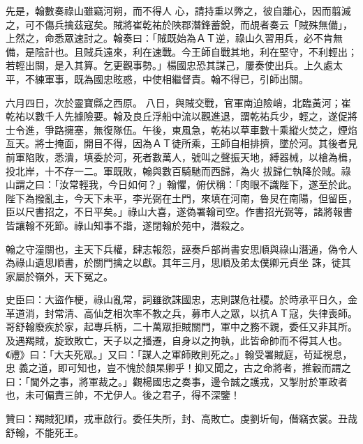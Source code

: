 \begin{pinyinscope}
 先是，翰數奏祿山雖竊河朔，而不得人
 心，請持重以弊之，彼自離心，因而翦滅之，可不傷兵擒茲寇矣。賊將崔乾祐於陜郡潛鋒蓄銳，而覘者奏云「賊殊無備」，上然之，命悉眾速討之。翰奏曰：「賊既始為ＡＴ逆，祿山久習用兵，必不肯無備，是陰計也。且賊兵遠來，利在速戰。今王師自戰其地，利在堅守，不利輕出；若輕出關，是入其算。乞更觀事勢。」楊國忠恐其謀己，屢奏使出兵。上久處太平，不練軍事，既為國忠眩惑，中使相繼督責。翰不得已，引師出關。



 六月四日，次於靈寶縣之西原。
 八日，與賊交戰，官軍南迫險峭，北臨黃河；崔乾祐以數千人先據險要。翰及良丘浮船中流以觀進退，謂乾祐兵少，輕之，遂促將士令進，爭路擁塞，無復隊伍。午後，東風急，乾祐以草車數十乘縱火焚之，煙焰亙天。將士掩面，開目不得，因為ＡＴ徒所乘，王師自相排擠，墜於河。其後者見前軍陷敗，悉潰，填委於河，死者數萬人，號叫之聲振天地，縛器械，以槍為楫，投北岸，十不存一二。軍既敗，翰與數百騎馳而西歸，為火
 拔歸仁執降於賊。祿山謂之曰：「汝常輕我，今日如何？」翰懼，俯伏稱：「肉眼不識陛下，遂至於此。陛下為撥亂主，今天下未平，李光弼在土門，來填在河南，魯炅在南陽，但留臣，臣以尺書招之，不日平矣。」祿山大喜，遂偽署翰司空。作書招光弼等，諸將報書皆讓翰不死節。祿山知事不諧，遂閉翰於苑中，潛殺之。



 翰之守潼關也，主天下兵權，肆志報怨，誣奏戶部尚書安思順與祿山潛通，偽令人為祿山遺思順書，於關門擒之以獻。其年三月，思順及弟太僕卿元貞坐
 誅，徙其家屬於嶺外，天下冤之。



 史臣曰：大盜作梗，祿山亂常，詞雖欲誅國忠，志則謀危社稷。於時承平日久，金革道消，封常清、高仙芝相次率不教之兵，募市人之眾，以抗ＡＴ寇，失律喪師。哥舒翰廢疾於家，起專兵柄，二十萬眾拒賊關門，軍中之務不親，委任又非其所。及遇羯賊，旋致敗亡，天子以之播遷，自身以之拘執，此皆命帥而不得其人也。《禮》曰：「大夫死眾。」又曰：「謀人之軍師敗則死之。」翰受署賊庭，茍延視息，忠
 義之道，即可知也，豈不愧於顏杲卿乎！抑又聞之，古之命將者，推轂而謂之曰：「閫外之事，將軍裁之。」觀楊國忠之奏事，邊令誠之護戎，又掣肘於軍政者也，未可偏責三帥，不尤伊人。後之君子，得不深鑒！



 贊曰：羯賊犯順，戎車啟行。委任失所，封、高敗亡。虔劉圻甸，僭竊衣裳。丑哉舒翰，不能死王。



\end{pinyinscope}